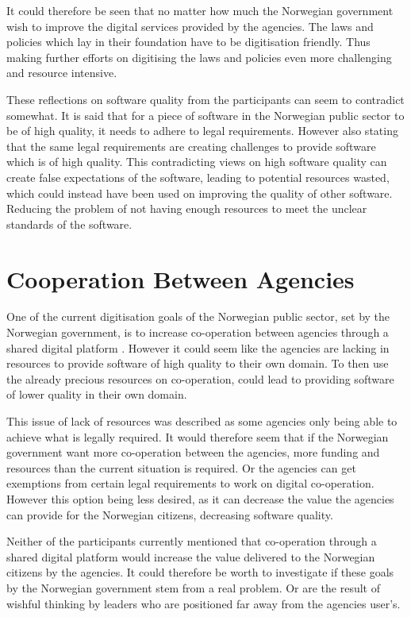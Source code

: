 It could therefore be seen that no matter how much the Norwegian government wish to improve the digital services provided by the agencies. The laws and policies which lay in their foundation have to be digitisation friendly. Thus making further efforts on digitising the laws and policies even more challenging and resource intensive.

These reflections on software quality from the participants can seem to contradict somewhat. It is said that for a piece of software in the Norwegian public sector to be of high quality, it needs to adhere to legal requirements. However also stating that the same legal requirements are creating challenges to provide software which is of high quality. This contradicting views on high software quality can create false expectations of the software, leading to potential resources wasted, which could instead have been used on improving the quality of other software. Reducing the problem of not having enough resources to meet the unclear standards of the software.

\section{Cooperation Between Agencies}
One of the current digitisation goals of the Norwegian public sector, set by the Norwegian government, is to increase co-operation between agencies through a shared digital platform \cite{r_2019}. However it could seem like the agencies are lacking in resources to provide software of high quality to their own domain. To then use the already precious resources on co-operation, could lead to providing software of lower quality in their own domain. 

This issue of lack of resources was described as some agencies only being able to achieve what is legally required. It would therefore seem that if the Norwegian government want more co-operation between the agencies, more funding and resources than the current situation is required. Or the agencies can get exemptions from certain legal requirements to work on digital co-operation. However this option being less desired, as it can decrease the value the agencies can provide for the Norwegian citizens, decreasing software quality.

Neither of the participants currently mentioned that co-operation through a shared digital platform would increase the value delivered to the Norwegian citizens by the agencies. It could therefore be worth to investigate if these goals by the Norwegian government stem from a real problem. Or are the result of wishful thinking by leaders who are positioned far away from the agencies user's. 

